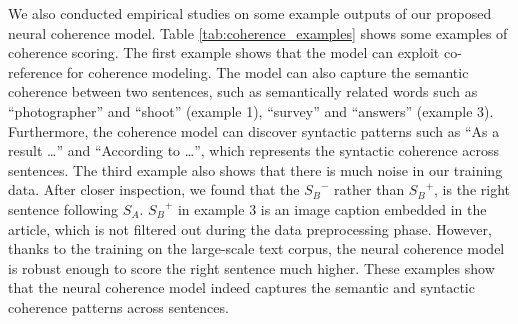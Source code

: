 \documentclass[letterpaper]{article} \usepackage{aaai18}  \usepackage{times}  \usepackage{helvet}  \usepackage{courier}  \usepackage{url}  \usepackage{graphicx}  \usepackage{amssymb}
\begin{document}
	We also conducted empirical studies on some example outputs of our proposed neural coherence model. Table \ref{tab:coherence_examples} shows some examples of coherence scoring. The first example shows that the model can exploit co-reference for coherence modeling. The model can also capture the semantic coherence between two sentences, such as semantically related words such as ``photographer'' and ``shoot'' (example 1), ``survey'' and ``answers'' (example 3). Furthermore, the coherence model can discover syntactic patterns such as ``As a result \dots'' and ``According to \dots'', which represents the syntactic coherence across sentences. The third example also shows that there is much noise in our training data. After closer inspection, we found that the ${S_B}^{-}$ rather than ${S_B}^{+}$, is the right sentence following ${S_A}$. ${S_B}^{+}$ in example 3 is an image caption embedded in the article, which is not filtered out during the data preprocessing phase. However, thanks to the training on the large-scale text corpus, the neural coherence model is robust enough to score the right sentence much higher. These examples show that the neural coherence model indeed captures the semantic and syntactic coherence patterns across sentences.
\end{document}
